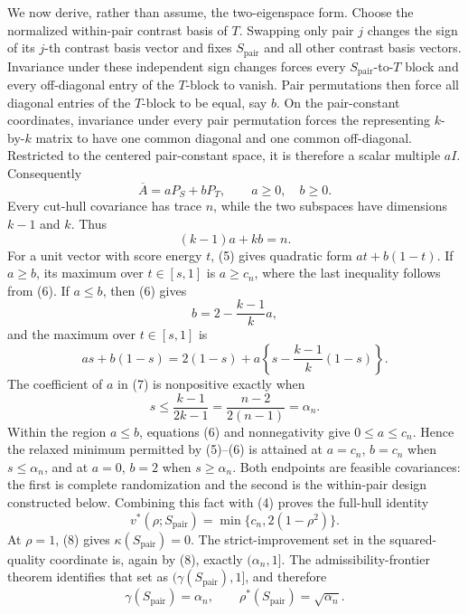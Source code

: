 We now derive, rather than assume, the two-eigenspace form.  Choose the normalized within-pair contrast basis of \(T\).  Swapping only pair \(j\) changes the sign of its \(j\)-th contrast basis vector and fixes \(S_{\mathrm{pair}}\) and all other contrast basis vectors.  Invariance under these independent sign changes forces every \(S_{\mathrm{pair}}\)-to-\(T\) block and every off-diagonal entry of the \(T\)-block to vanish.  Pair permutations then force all diagonal entries of the \(T\)-block to be equal, say \(b\).  On the pair-constant coordinates, invariance under every pair permutation forces the representing \(k\)-by-\(k\) matrix to have one common diagonal and one common off-diagonal.  Restricted to the centered pair-constant space, it is therefore a scalar multiple \(aI\).  Consequently
\[
 \overline A=aP_S+bP_T,
 \qquad a\geq0,\quad b\geq0.
 \tag{5}
\]
Every cut-hull covariance has trace \(n\), while the two subspaces have dimensions \(k-1\) and \(k\).  Thus
\[
 (k-1)a+kb=n.
 \tag{6}
\]
For a unit vector with score energy \(t\), (5) gives quadratic form \(at+b(1-t)\).  If \(a\geq b\), its maximum over \(t\in[s,1]\) is \(a\geq c_n\), where the last inequality follows from (6).  If \(a\leq b\), then (6) gives
\[
 b=2-\frac{k-1}{k}a,
\]
and the maximum over \(t\in[s,1]\) is
\[
 as+b(1-s)
 =2(1-s)+a\left\{s-\frac{k-1}{k}(1-s)\right\}.
 \tag{7}
\]
The coefficient of \(a\) in (7) is nonpositive exactly when
\[
 s\leq\frac{k-1}{2k-1}=\frac{n-2}{2(n-1)}=\alpha_n.
\]
Within the region \(a\leq b\), equations (6) and nonnegativity give \(0\leq a\leq c_n\).  Hence the relaxed minimum permitted by (5)--(6) is attained at \(a=c_n\), \(b=c_n\) when \(s\leq\alpha_n\), and at \(a=0\), \(b=2\) when \(s\geq\alpha_n\).  Both endpoints are feasible covariances: the first is complete randomization and the second is the within-pair design constructed below.  Combining this fact with (4) proves the full-hull identity
\[
 v^*(\rho;S_{\mathrm{pair}})
 =\min\{c_n,2(1-\rho^2)\}.
 \tag{8}
\]
At \(\rho=1\), (8) gives \(\kappa(S_{\mathrm{pair}})=0\).  The strict-improvement set in the squared-quality coordinate is, again by (8), exactly \((\alpha_n,1]\).  The admissibility-frontier theorem identifies that set as \((\gamma(S_{\mathrm{pair}}),1]\), and therefore
\[
 \gamma(S_{\mathrm{pair}})=\alpha_n,
 \qquad
 \rho^*(S_{\mathrm{pair}})=\sqrt{\alpha_n}.
\]

